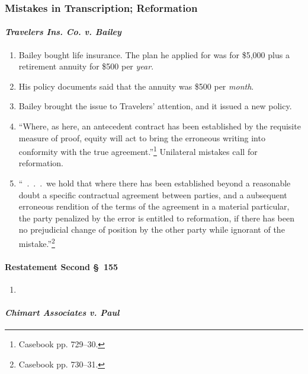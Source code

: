 \subsubsection{Mistakes in Transcription; Reformation}

\paragraph{\emph{Travelers Ins. Co. v. Bailey}}

\begin{enumerate}
    \item Bailey bought life insurance. The plan he applied for was for 
    \$5,000 plus a retirement annuity for \$500 per \emph{year}.
    \item His policy documents said that the annuity was \$500 per 
    \emph{month}.
    \item Bailey brought the issue to Travelers' attention, and it issued a 
    new policy.
    \item ``Where, as here, an antecedent contract has been established by the 
    requisite measure of proof, equity will act to bring the erroneous writing 
    into conformity with the true agreement.''\footnote{Casebook pp. 729--30.} 
    Unilateral mistakes call for reformation.
    \item ``~.~.~.~we hold that where there has been established beyond a 
    reasonable doubt a specific contractual agreement between parties, and a 
    aubsequent erroneous rendition of the terms of the agreement in a material 
    particular, the party penalized by the error is entitled to reformation, 
    if there has been no prejudicial change of position by the other party 
    while ignorant of the mistake.''\footnote{Casebook pp. 730--31.}
\end{enumerate}

\paragraph{Restatement Second \S\ 155}

\begin{enumerate}
    \item %
\end{enumerate}

\paragraph{\emph{Chimart Associates v. Paul}}

